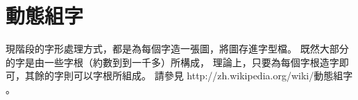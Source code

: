 ﻿
\chapter{動態組字}
現階段的字形處理方式，都是為每個字造一張圖，將圖存進字型檔。%
既然大部分的字是由一些字根（約數到到一千多）所構成，%
理論上，只要為每個字根造字即可，其餘的字則可以字根所組成。%
請參見 http://zh.wikipedia.org/wiki/動態組字 。%

